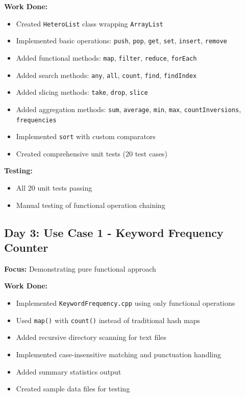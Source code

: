 \documentclass[11pt,a4paper]{article}
\begin{document}
\textbf{Work Done:}
\begin{itemize}
    \item Created \texttt{HeteroList} class wrapping \texttt{ArrayList}
    \item Implemented basic operations: \texttt{push}, \texttt{pop}, \texttt{get}, \texttt{set}, \texttt{insert}, \texttt{remove}
    \item Added functional methods: \texttt{map}, \texttt{filter}, \texttt{reduce}, \texttt{forEach}
    \item Added search methods: \texttt{any}, \texttt{all}, \texttt{count}, \texttt{find}, \texttt{findIndex}
    \item Added slicing methods: \texttt{take}, \texttt{drop}, \texttt{slice}
    \item Added aggregation methods: \texttt{sum}, \texttt{average}, \texttt{min}, \texttt{max}, \texttt{countInversions}, \texttt{frequencies}
    \item Implemented \texttt{sort} with custom comparators
    \item Created comprehensive unit tests (20 test cases)
\end{itemize}

\textbf{Testing:}
\begin{itemize}
    \item All 20 unit tests passing
    \item Manual testing of functional operation chaining
\end{itemize}

\subsection{Day 3: Use Case 1 - Keyword Frequency Counter}

\textbf{Focus:} Demonstrating pure functional approach

\textbf{Work Done:}
\begin{itemize}
    \item Implemented \texttt{KeywordFrequency.cpp} using only functional operations
    \item Used \texttt{map()} with \texttt{count()} instead of traditional hash maps
    \item Added recursive directory scanning for text files
    \item Implemented case-insensitive matching and punctuation handling
    \item Added summary statistics output
    \item Created sample data files for testing
\end{itemize}
\end{document}
